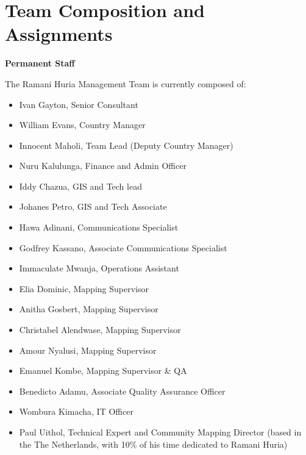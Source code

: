 \documentclass[a4paper,12pt,twoside]{article}
\begin{document}
\newpage
\section{Team Composition and Assignments}

\textbf{Permanent Staff}

\medskip

The Ramani Huria Management Team is currently composed of:
\begin{itemize}
     
 \item Ivan Gayton, Senior Consultant
 \item William Evans, Country Manager
 \item Innocent Maholi, Team Lead (Deputy Country Manager)
 \item Nuru Kalulunga, Finance and Admin Officer
 \item Iddy Chazua, GIS and Tech lead
 \item Johanes Petro, GIS and Tech Associate
 \item Hawa Adinani, Communications Specialist
 \item Godfrey Kassano, Associate Communications Specialist
 \item Immaculate Mwanja, Operations Assistant
 \item Elia Dominic, Mapping Supervisor
 \item Anitha Gosbert, Mapping Supervisor
 \item Christabel Alendwase, Mapping Supervisor
 \item Amour Nyalusi, Mapping Supervisor
 \item Emanuel Kombe, Mapping Supervisor & QA
 \item Benedicto Adamu, Associate Quality Assurance Officer
 \item Wombura Kimacha, IT Officer
 \item Paul Uithol, Technical Expert and Community Mapping Director (based in the
The Netherlands, with 10\% of his time dedicated to Ramani Huria)
\end{itemize}

\newpage
\end{document}
